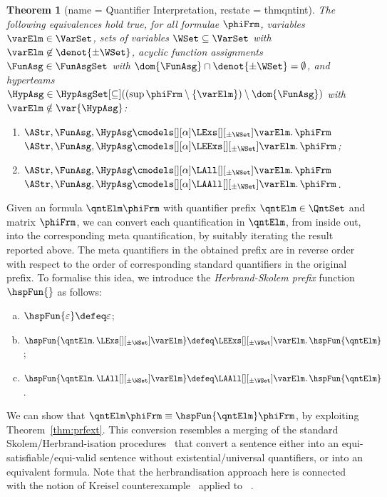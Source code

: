 \documentclass[authoryear]{elsarticle}
\newtheorem{theorem}{Theorem}
\begin{document}
\begin{theorem}[name = Quantifier Interpretation, restate = thmqntint]
  \label{thm:qntint}
  The following equivalences hold true, for all \FOL formulae $\phiFrm$,
  variables $\varElm \in \VarSet$, sets of variables $\WSet \subseteq \VarSet$
  with $\varElm \not\in \denot{\pm\WSet}$, acyclic function assignments
  $\FunAsg \in \FunAsgSet$ with $\dom{\FunAsg} \cap \denot{\pm\WSet} =
  \emptyset$, and hyperteams $\HypAsg \in \HypAsgSet[\subseteq]((\sup{\phiFrm}
  \setminus \{ \varElm \}) \setminus \dom{\FunAsg})$ with $\varElm \notin
  \var{\HypAsg}$:
  \begin{enumerate}[1)]
    \item\label{thm:qntint(exs)}
      $\AStr, \FunAsg, \HypAsg \cmodels[][\alpha] \LExs[][_{\pm\WSet}] \varElm
      \ldotp \phiFrm$ \iff $\AStr, \FunAsg, \HypAsg \cmodels[][\alpha]
      \LEExs[][_{\pm\WSet}] \varElm \ldotp \phiFrm$;
    \item\label{thm:qntint(all)}
      $\AStr, \FunAsg, \HypAsg \cmodels[][\alpha] \LAll[][_{\pm\WSet}] \varElm
      \ldotp \phiFrm$ \iff $\AStr, \FunAsg, \HypAsg \cmodels[][\alpha]
      \LAAll[][_{\pm\WSet}] \varElm \ldotp \phiFrm$.
  \end{enumerate}
\end{theorem}

Given an \ADIF formula $\qntElm \phiFrm$ with quantifier prefix $\qntElm \in
\QntSet$ and \FOL matrix $\phiFrm$, we can convert each quantification in
$\qntElm$, from inside out, into the corresponding meta quantification, by
suitably iterating the result reported above.
The meta quantifiers in the obtained prefix are in reverse order with respect to
the order of corresponding standard quantifiers in the original prefix.
To formalise this idea, we introduce the \emph{Herbrand-Skolem prefix} function
$\hspFun{}$ as follows:
\begin{enumerate}[a)]
  \item
    $\hspFun{\varepsilon} \defeq \varepsilon$;
  \item
    $\hspFun{\qntElm \ldotp \LExs[][_{\pm\WSet}] \varElm} \defeq
    \LEExs[][_{\pm\WSet}] \varElm \ldotp \hspFun{\qntElm}$;
  \item
    $\hspFun{\qntElm \ldotp \LAll[][_{\pm\WSet}] \varElm} \defeq
    \LAAll[][_{\pm\WSet}] \varElm \ldotp \hspFun{\qntElm}$.
\end{enumerate}
We can show that $\qntElm \phiFrm \equiv \hspFun{\qntElm} \phiFrm$, by
exploiting Theorem~\ref{thm:prfext}.
This conversion resembles a merging of the standard Skolem/Herbrand-isation
procedures~\citep{Hei67,Bus98a} that convert a \FOL sentence either into an
equi-satisfiable/equi-valid \FOL sentence without existential/universal
quantifiers, or into an equivalent \SOL formula.
Note that the herbrandisation approach here is connected with the notion of
Kreisel counterexample~\citep{Kre51,Kre52} applied to \DIF~\citep{MSS11}.
\end{document}
